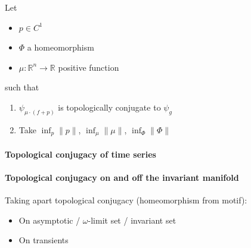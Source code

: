 \documentclass{article}
\theoremstyle{definition} \newtheorem{definition}{Definition}  \newtheorem{example}{Example}
\theoremstyle{remark} \newtheorem{remark}{Remark}
\newcounter{ct}
\newcommand{\field}[1]{\ensuremath{\mathbb{#1}}}
\newcommand{\reals}{\field{R}}
\begin{document}
Let 
\begin{itemize}
\item $p\in C^1$
\item $\Phi$ a homeomorphism
\item $\mu\colon \reals^n\rightarrow \reals$ positive function
\end{itemize}
such that 
\begin{enumerate}
\item $\psi_{\mu \cdot (f+p)}$ is topologically conjugate to $\psi_{g}$
\item Take $\inf_p \|p\|$, $\inf_\mu \|\mu\|$, $\inf_\Phi \|\Phi\|$
\end{enumerate}


\paragraph{Topological conjugacy of time series}
\citep{dlotko2024topconj}


\paragraph{Topological conjugacy on and off the invariant manifold}
Taking apart topological conjugacy (homeomorphism from motif):
\begin{itemize}
\item On asymptotic / $\omega$-limit set / invariant set
\item On transients \citep{koch2024biological}
\end{itemize}
\end{document}

